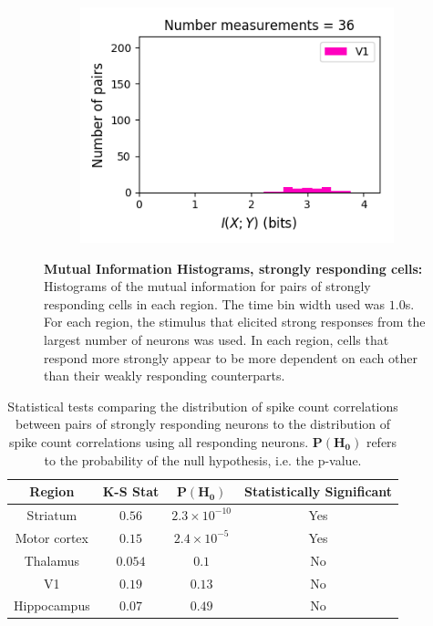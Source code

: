 \documentclass[a4paper,12pt]{article}
\theoremstyle{definition}
\begin{document}
\begin{figure}[p]
\begin{subfigure}{0.5\textwidth}
    \includegraphics[width=\textwidth]{figures/strong_v1_6_1p0_information_histogram.png}
  \end{subfigure}
  \caption{\textbf{Mutual Information Histograms, strongly responding cells:} Histograms of the mutual information for pairs of strongly responding cells in each region. The time bin width used was $1.0$s. For each region, the stimulus that elicited strong responses from the largest number of neurons was used. In each region, cells that respond more strongly appear to be more dependent on each other than their weakly responding counterparts.}
  \label{fig:strong_info_histograms}
\end{figure}

\begin{table}[ht!]
  \begin{center}
    \caption{Statistical tests comparing the distribution of spike count correlations between pairs of strongly responding neurons to the distribution of spike count correlations using all responding neurons. $\mathbf{P(H_0)}$ refers to the probability of the null hypothesis, i.e. the p-value.}
    \label{tab:strong_corr_ks_test}
    \begin{tabular}{c|c|c|c} %
      \textbf{Region} & \textbf{K-S Stat} & $\mathbf{P(H_0)}$ & \textbf{Statistically Significant}\\
      \hline
      Striatum      & $0.56$    & $2.3 \times 10^{-10}$   & Yes \\
      Motor cortex  & $0.15$    & $2.4 \times 10^{-5}$    & Yes \\
      Thalamus      & $0.054$   & $0.1$                   & No \\
      V1            & $0.19$    & $0.13$                  & No \\
      Hippocampus   & $0.07$    & $0.49$                  & No \\
    \end{tabular}
  \end{center}
\end{table}
\end{document}
